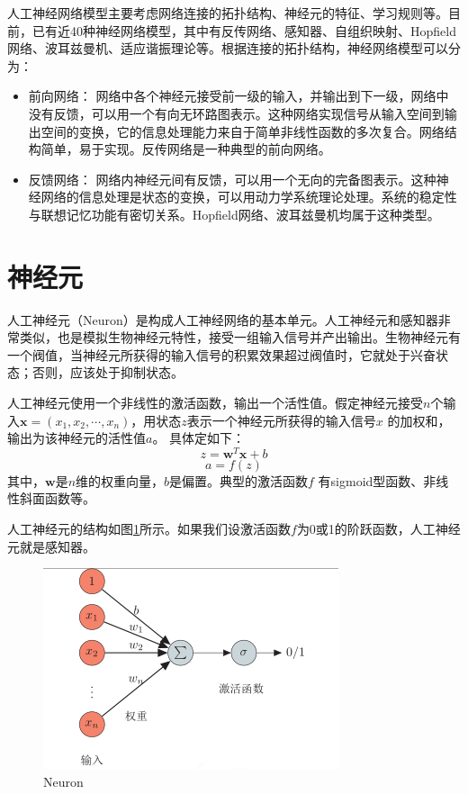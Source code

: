 \documentclass[11pt,fleqn, UTF8]{ctexbook} %
\begin{document}
人工神经网络模型主要考虑网络连接的拓扑结构、神经元的特征、学习规则等。目前，已有近40种神经网络模型，其中有反传网络、感知器、自组织映射、Hopfield 网络、波耳兹曼机、适应谐振理论等。根据连接的拓扑结构，神经网络模型可以分为：
\begin{itemize}
  \item 前向网络：
  网络中各个神经元接受前一级的输入，并输出到下一级，网络中没有反馈，可以用一个有向无环路图表示。这种网络实现信号从输入空间到输出空间的变换，它的信息处理能力来自于简单非线性函数的多次复合。网络结构简单，易于实现。反传网络是一种典型的前向网络。
  \item 反馈网络：
  网络内神经元间有反馈，可以用一个无向的完备图表示。这种神经网络的信息处理是状态的变换，可以用动力学系统理论处理。系统的稳定性与联想记忆功能有密切关系。Hopfield网络、波耳兹曼机均属于这种类型。
\end{itemize}
\section{神经元}
人工神经元（Neuron）是构成人工神经网络的基本单元。人工神经元和感知器非常类似，也是模拟生物神经元特性，接受一组输入信号并产出输出。生物神经元有一个阀值，当神经元所获得的输入信号的积累效果超过阀值时，它就处于兴奋状态；否则，应该处于抑制状态。

人工神经元使用一个非线性的激活函数，输出一个活性值。假定神经元接受$n$个输入$\boldsymbol{x} = (x_1,x_2,\cdots ,x_n)$，用状态$z$表示一个神经元所获得的输入信号$x$ 的加权和，输出为该神经元的活性值$a$。 具体定如下：
\begin{equation*}
  z=\boldsymbol{w}^T\boldsymbol{x}+b
\end{equation*}
\begin{equation*}
  a=f(z)
\end{equation*}
其中，$\boldsymbol{w}$是$n$维的权重向量，$b$是偏置。典型的激活函数$f$ 有sigmoid型函数、非线性斜面函数等。

人工神经元的结构如图\ref{fig:5.1}所示。如果我们设激活函数$f$为0或1的阶跃函数，人工神经元就是感知器。

\begin{figure}[t]
 \centering
 \includegraphics{pics/51.png}
 \caption{Neuron}
 \label{fig:5.1}
\end{figure}
\end{document}

